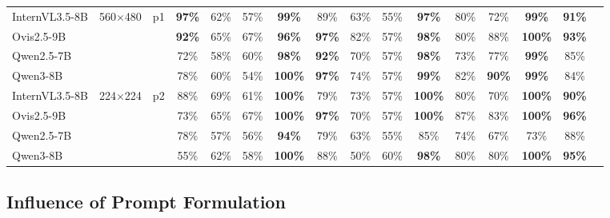 \documentclass[11pt]{article}
\newcommand{\heatDG}[1]{\cellcolor{mydarkgreen}\textbf{#1}}
\newcommand{\heatG}[1]{\cellcolor{mygreen}#1}
\newcommand{\heatLG}[1]{\cellcolor{mylightgreen}#1}
\newcommand{\heatO}[1]{\cellcolor{myorange}#1}
\begin{document}
\begin{table}[t]
{\begin{tabular}{lccccccccccccccc}
\midrule
InternVL3.5-8B
& \multirow{4}{*}{560$\times$480}
& \multirow{4}{*}{p1}
& \heatDG{97\%} & \heatG{62\%} & \heatLG{57\%} & \heatDG{99\%} & \heatG{89\%} & \heatG{63\%} & \heatLG{55\%} & \heatDG{97\%} & \heatG{80\%} & \heatG{72\%} & \heatDG{99\%} & \heatDG{91\%} \\

Ovis2.5-9B
& & 
& \heatDG{92\%} & \heatG{65\%} & \heatG{67\%} & \heatDG{96\%} & \heatDG{97\%} & \heatG{82\%} & \heatLG{57\%} & \heatDG{98\%} & \heatG{80\%} & \heatG{88\%} & \heatDG{100\%} & \heatDG{93\%} \\

Qwen2.5-7B
& & 
& \heatG{72\%} & \heatLG{58\%} & \heatG{60\%} & \heatDG{98\%} & \heatDG{92\%} & \heatG{70\%} & \heatLG{57\%} & \heatDG{98\%} & \heatG{73\%} & \heatG{77\%} & \heatDG{99\%} & \heatG{85\%} \\

Qwen3-8B
& & 
& \heatG{78\%} & \heatG{60\%} & \heatLG{54\%} & \heatDG{100\%} & \heatDG{97\%} & \heatG{74\%} & \heatLG{57\%} & \heatDG{99\%} & \heatG{82\%} & \heatDG{90\%} & \heatDG{99\%} & \heatG{84\%} \\

\midrule
InternVL3.5-8B
& \multirow{4}{*}{224$\times$224}
& \multirow{4}{*}{p2}
& \heatG{88\%} & \heatG{69\%} & \heatG{61\%} & \heatDG{100\%} & \heatG{79\%} & \heatG{73\%} & \heatLG{57\%} & \heatDG{100\%} & \heatG{80\%} & \heatG{70\%} & \heatDG{100\%} & \heatDG{90\%} \\

Ovis2.5-9B
& & 
& \heatG{73\%} & \heatG{65\%} & \heatG{67\%} & \heatDG{100\%} & \heatDG{97\%} & \heatG{70\%} & \heatLG{57\%} & \heatDG{100\%} & \heatG{87\%} & \heatG{83\%} & \heatDG{100\%} & \heatDG{96\%} \\

Qwen2.5-7B
& & 
& \heatG{78\%} & \heatLG{57\%} & \heatLG{56\%} & \heatDG{94\%} & \heatG{79\%} & \heatG{63\%} & \heatLG{55\%} & \heatG{85\%} & \heatG{74\%} & \heatG{67\%} & \heatG{73\%} & \heatG{88\%} \\

Qwen3-8B
& & 
& \heatLG{55\%} & \heatG{62\%} & \heatLG{58\%} & \heatDG{100\%} & \heatG{88\%} & \heatO{50\%} & \heatG{60\%} & \heatDG{98\%} & \heatG{80\%} & \heatG{80\%} & \heatDG{100\%} & \heatDG{95\%} \\
\bottomrule
\end{tabular}%
}
\end{table}




\subsection{Influence of Prompt Formulation}
\end{document}

